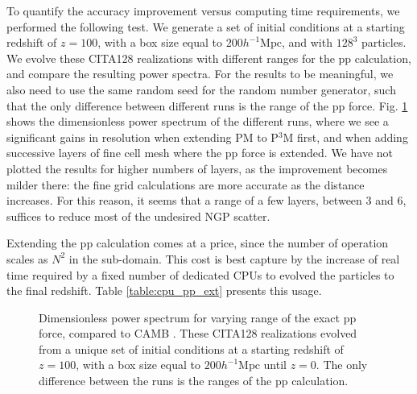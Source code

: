  
 
 To quantify the accuracy improvement versus computing time requirements, we performed the following test.
 We generate a set of initial conditions at a starting redshift of $z = 100$, with a box size equal to $ 200 h^{-1}\mbox{Mpc}$,
 and with $128^{3}$ particles. We evolve these CITA128 realizations with different ranges for the pp calculation, and compare 
 the resulting power spectra. For the results to be meaningful, we also need to use the same random seed for the random number generator,
 such that the only difference between different runs is the range of the pp force.
 Fig. \ref{fig:power} shows the dimensionless power spectrum of the different runs, where we see a significant gains in resolution
 when extending  PM to P$^{3}$M first, and when adding successive layers of fine cell mesh where the pp force is extended.
We have not plotted the results for higher numbers of layers, as the improvement becomes milder there: the fine grid calculations
are more accurate as the distance increases. For this reason, it seems that a range of a few layers, between 3 and 6, suffices 
to reduce most of the undesired NGP scatter.

Extending the pp calculation comes at a price, since the number of operation scales as  $N^{2}$ in the sub-domain. 
This cost is best capture by the increase of real time required by a fixed number of dedicated  {\small CPU}s 
to evolved the particles to the final redshift. Table \ref{table:cpu_pp_ext} presents this usage.

\begin{figure}
  \begin{center}
  \caption{ Dimensionless power spectrum for varying range of the exact pp force, compared to  {\small CAMB} \citep{Lewis:1999bs}.
  These CITA128 realizations evolved from a unique set of initial conditions at a starting redshift of $z = 100$, with a box size equal to $ 200 h^{-1}\mbox{Mpc}$ 
  until $z=0$. The only difference between the runs is the ranges of the pp calculation.}
    \label{fig:power}
  \end{center}
\end{figure}


